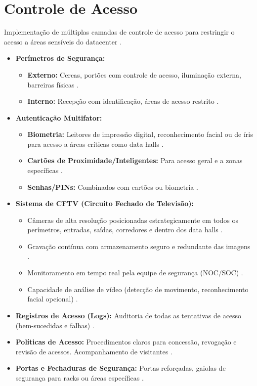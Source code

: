 \documentclass[
	12pt,				%
	oneside,			%
	a4paper,			%
	english,			%
	brazil				%
	]{abntex2unama}
\begin{document}
\section{Controle de Acesso}
Implementação de múltiplas camadas de controle de acesso para restringir o acesso a áreas sensíveis do datacenter \cite{reliability_engineering}.
\begin{itemize}
	\item \textbf{Perímetros de Segurança:}
	      \begin{itemize}
		      \item \textbf{Externo:} Cercas, portões com controle de acesso, iluminação externa, barreiras físicas \cite{datacenter_security}.
		      \item \textbf{Interno:} Recepção com identificação, áreas de acesso restrito \cite{design_principles}.
	      \end{itemize}
	\item \textbf{Autenticação Multifator:}
	      \begin{itemize}
		      \item \textbf{Biometria:} Leitores de impressão digital, reconhecimento facial ou de íris para acesso a áreas críticas como data halls \cite{datacenter_monitoring}.
		      \item \textbf{Cartões de Proximidade/Inteligentes:} Para acesso geral e a zonas específicas \cite{datacenter_security}.
		      \item \textbf{Senhas/PINs:} Combinados com cartões ou biometria \cite{reliability_engineering}.
	      \end{itemize}
	\item \textbf{Sistema de CFTV (Circuito Fechado de Televisão):}
	      \begin{itemize}
		      \item Câmeras de alta resolução posicionadas estrategicamente em todos os perímetros, entradas, saídas, corredores e dentro dos data halls \cite{dcim_systems}.
		      \item Gravação contínua com armazenamento seguro e redundante das imagens \cite{datacenter_security}.
		      \item Monitoramento em tempo real pela equipe de segurança (NOC/SOC) \cite{datacenter_monitoring}.
		      \item Capacidade de análise de vídeo (detecção de movimento, reconhecimento facial opcional) \cite{ai_automation}.
	      \end{itemize}
	\item \textbf{Registros de Acesso (Logs):} Auditoria de todas as tentativas de acesso (bem-sucedidas e falhas) \cite{dcim_systems}.
	\item \textbf{Políticas de Acesso:} Procedimentos claros para concessão, revogação e revisão de acessos. Acompanhamento de visitantes \cite{datacenter_security}.
	\item \textbf{Portas e Fechaduras de Segurança:} Portas reforçadas, gaiolas de segurança para racks ou áreas específicas \cite{design_principles}.
\end{itemize}
\end{document}
